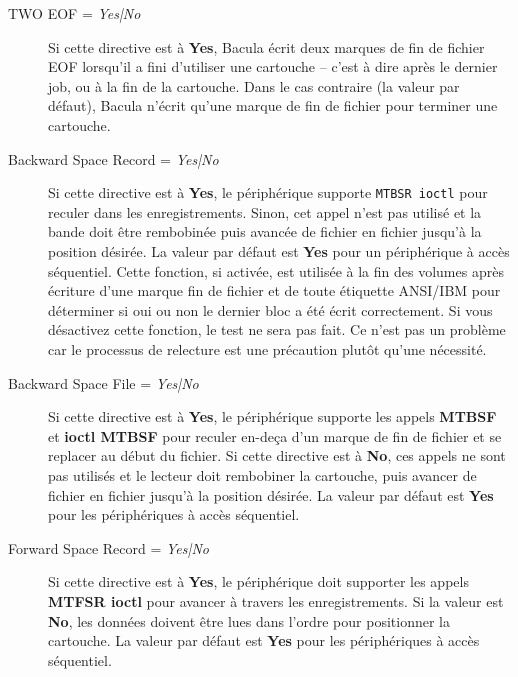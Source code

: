 \begin{description}
\item [TWO EOF = {\it Yes|No}]
   Si cette directive est \`a {\bf Yes}, Bacula \'ecrit deux marques de fin de fichier EOF 
   lorsqu'il a fini d'utiliser une cartouche -- c'est \`a dire apr\`es le dernier 
   job, ou \`a la fin de la cartouche. Dans le cas contraire (la valeur par d\'efaut), 
   Bacula n'\'ecrit qu'une marque de fin de fichier pour terminer une cartouche.

\item [Backward Space Record = {\it Yes|No}]
   Si cette directive est \`a {\bf Yes}, le p\'eriph\'erique supporte {\tt MTBSR  ioctl} 
   pour reculer dans les enregistrements. Sinon, cet appel n'est pas utilis\'e 
   et la bande doit \^etre rembobin\'ee puis avanc\'ee de fichier en fichier jusqu'\`a 
   la position d\'esir\'ee. La valeur par d\'efaut est {\bf Yes} pour un p\'eriph\'erique 
   \`a acc\`es s\'equentiel. Cette fonction, si activ\'ee, est utilis\'ee \`a la fin des 
   volumes apr\`es \'ecriture d'une marque fin de fichier et de toute \'etiquette 
   ANSI/IBM pour d\'eterminer si oui ou non le dernier bloc a \'et\'e \'ecrit 
   correctement. Si vous d\'esactivez cette fonction, le test ne sera pas fait. 
   Ce n'est pas un probl\`eme car le processus de relecture est une 
   pr\'ecaution plut\^ot qu'une n\'ecessit\'e.
   
\item [Backward Space File = {\it Yes|No}]
   Si cette directive est \`a {\bf Yes}, le p\'eriph\'erique supporte les appels  
   {\bf MTBSF} et {\bf ioctl MTBSF} pour reculer en-de\c{c}a d'un marque de fin de fichier 
   et se replacer au d\'ebut du fichier. Si cette directive est \`a  {\bf No}, ces appels 
   ne sont pas utilis\'es et le lecteur doit rembobiner la cartouche, puis avancer 
   de fichier en fichier jusqu'\`a la position d\'esir\'ee. La valeur par d\'efaut est 
   {\bf Yes} pour les p\'eriph\'eriques \`a acc\`es s\'equentiel.

\item [Forward Space Record = {\it Yes|No}]
   Si cette directive est \`a {\bf Yes}, le p\'eriph\'erique doit supporter les appels
   {\bf MTFSR  ioctl} pour avancer \`a travers les 
   enregistrements. Si la valeur est {\bf No}, les donn\'ees doivent \^etre lues dans l'ordre 
   pour positionner la cartouche. La valeur par d\'efaut est 
   {\bf Yes} pour les p\'eriph\'eriques \`a acc\`es s\'equentiel.
   

\end{description}
